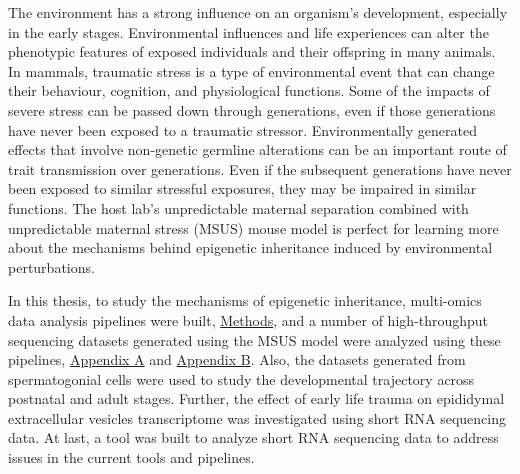 \documentclass[12pt,twoside]{reedthesis}
\begin{document}
The environment has a strong influence on an organism's development, especially in the early stages. Environmental influences and life experiences can alter the phenotypic features of exposed individuals and their offspring in many animals. In mammals, traumatic stress is a type of environmental event that can change their behaviour, cognition, and physiological functions. Some of the impacts of severe stress can be passed down through generations, even if those generations have never been exposed to a traumatic stressor. Environmentally generated effects that involve non-genetic germline alterations can be an important route of trait transmission over generations. Even if the subsequent generations have never been exposed to similar stressful exposures, they may be impaired in similar functions. The host lab's unpredictable maternal separation combined with unpredictable maternal stress (MSUS) mouse model is perfect for learning more about the mechanisms behind epigenetic inheritance induced by environmental perturbations.

In this thesis, to study the mechanisms of epigenetic inheritance, multi-omics data analysis pipelines were built, \protect\hyperlink{methods}{Methods}, and a number of high-throughput sequencing datasets generated using the MSUS model were analyzed using these pipelines, \protect\hyperlink{aa}{Appendix A} and \protect\hyperlink{ab}{Appendix B}. Also, the datasets generated from spermatogonial cells were used to study the developmental trajectory across postnatal and adult stages. Further, the effect of early life trauma on epididymal extracellular vesicles transcriptome was investigated using short RNA sequencing data. At last, a tool was built to analyze short RNA sequencing data to address issues in the current tools and pipelines.
\end{document}
